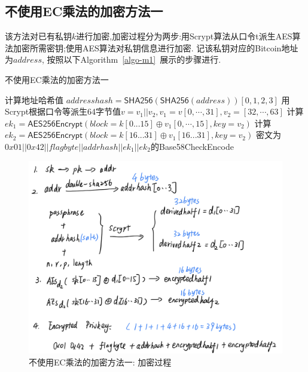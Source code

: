 \subsection{不使用EC乘法的加密方法一}

该方法对已有私钥$k$进行加密,加密过程分为两步:用Scrypt算法从口令t派生AES算法加密所需密钥;使用AES算法对私钥信息进行加密.
记该私钥对应的Bitcoin地址为$address$, 按照以下Algorithm~\ref{algo-m1}~展示的步骤进行.

\begin{algorithm}[h]\footnotesize
\caption{不使用EC乘法的加密方法一}\label{algo-m1}
\begin{algorithmic}[1]
	    	\STATE 计算地址哈希值 $addresshash = \textsf{SHA256}(\textsf{SHA256}(address))[0,1,2,3]$
		\STATE 用Scrypt根据口令等派生64字节值$v=v_1||v_2, v_1 = v[0,\cdots, 31], v_2= [32,\cdots,63]$
		\STATE 计算$ek_1 = \textsf{AES256Encrypt}(block = k[0...15] \oplus v_1[0,\cdots,15], key = v_2)$
		\STATE 计算$ek_2 = \textsf{AES256Encrypt}(block = k[16...31] \oplus v_1[16...31], key = v_2)$
		\STATE 密文为$0x01 || 0x42 || flagbyte || addrhash || ek_1 || ek_2$的\textsf{Base58CheckEncode}
\end{algorithmic}
\end{algorithm}




\begin{figure}[h]
\centering
\includegraphics[width=.7\textwidth]{./no-ec.png}
\caption{不使用EC乘法的加密方法一: 加密过程}\label{fig-m1-enc}
\end{figure}

